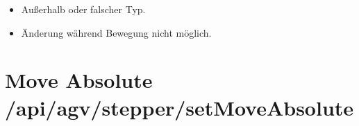 \documentclass[letterpaper,10pt,english]{sphinxmanual}
\begin{document}
\sphinxAtStartPar
{}

\begin{sphinxVerbatim}[commandchars=\\\{\}]
\end{sphinxVerbatim}

\sphinxAtStartPar
{}

\begin{sphinxVerbatim}[commandchars=\\\{\}]
\end{sphinxVerbatim}

\sphinxAtStartPar
{}
\begin{itemize}
\item {} 
\sphinxAtStartPar
{} \textendash{} Außerhalb \sphinxcode{\sphinxupquote{{[}0.0, 100.0{]}}} oder falscher Typ.

\item {} 
\sphinxAtStartPar
{} \textendash{} Änderung während Bewegung nicht möglich.

\end{itemize}


\section{Move Absolute \textendash{} /api/agv/stepper/setMoveAbsolute}
\label{\detokenize{agv_rest_api_stepper:move-absolute-api-agv-stepper-setmoveabsolute}}\label{\detokenize{agv_rest_api_stepper:post-api-agv-stepper-setmoveabsolute}}
\end{document}
